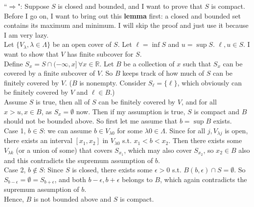 \documentclass[11pt,letterpaper]{article}
\begin{document}
\noindent ``\underline{$\Rightarrow$}": Suppose $S$ is closed and bounded, and I want to prove that $S$ is compact. Before I go on, I want to bring out this \textbf{lemma} first: a closed and bounded set contains its maximum and minimum. I will skip the proof and just use it because I am very lazy.\\
Let $\{V_\lambda, \lambda \in \Lambda\}$ be an open cover of $S$. Let $\ell = \inf S$ and $u = \sup S$. $\ell, u \in S$. I want to show that $V$ has finite subcover for $S$. \\
Define $S_x = S\cap (-\infty, x]\, \forall x \in \mathbb{R}$. Let $B$ be a collection of $x$ such that $S_x$ can be covered by a finite subcover of $V$. So $B$ keeps track of how much of $S$ can be finitely covered by $V$. ($B$ is nonempty. Consider $S_\ell = \{\ell\}$, which obviously can be finitely covered by $V$ and $\ell \in B$.)\\
Assume $S$ is true, then all of $S$ can be finitely covered by $V$, and for all $x > u, x\in B$, as $S_x = \emptyset$ now. Then if my assumption is true, $S$ is compact and $B$ should not be bounded above. So first let me assume that $b = \sup B$ exists. \\
Case 1, $b \in S$: we can assume $b\in V_{\lambda0}$ for some $\lambda0 \in \Lambda$. Since for all $j, V_{\lambda j}$ is open, there exists an interval $[x_1, x_2]$ in $V_{\lambda0}$ s.t. $x_1 < b < x_2$. Then there exists some $V_{\lambda k}$ (or a union of some) that covers $S_{x_1}$, which may also cover $S_{x_2}$, so $x_2 \in B$ also and this contradicts the supremum assumption of $b$.\\
Case 2, $b \notin S$: Since $S$ is closed, there exists some $\epsilon >0$ s.t. $B(b, \epsilon) \cap S = \emptyset$. So $S_{b-\epsilon} = \emptyset = S_{b+\epsilon}$, and both $b-\epsilon, b+\epsilon$ belongs to $B$, which again contradicts the supremum assumption of $b$.\\
Hence, $B$ is not bounded above and $S$ is compact. 

\begin{center}
\end{center}
\end{document}
